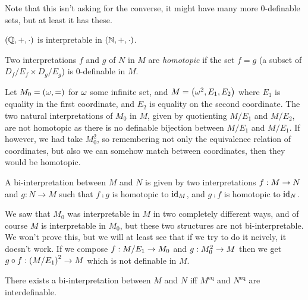 \documentclass{amsart}
\begin{document}
\begin{rmk}
Note that this isn't asking for the converse, it might have many more $0$-definable sets, 
but at least it has these.
\end{rmk}

\begin{exm}
$\left( \mathbb{Q} , + , \cdot \right)$ is interpretable in $\left( \mathbb{N} , + , \cdot \right)$.
\end{exm}

\begin{defn}
Two interpretations $f$ and $g$ of $N$ in $M$
are \emph{homotopic} if the set $f = g$
(a subset of $D_f / E_f \times D_g / E_g$) is $0$-definable in $M$.
\end{defn} 

\begin{exm}
Let $M_0 = \left( \omega , = \right)$ for $\omega$ some infinite set,
and $M = \left( \omega^2 , E_1 , E_2 \right)$ where $E_1$ is equality in the first coordinate, 
and $E_2$ is equality on the second coordinate.
The two natural interpretations of $M_0$ in $M$, given by quotienting
$M / E_1$ and $M / E_2$, are not homotopic as there is no definable bijection between
$M / E_1$ and $M / E_1$.
If however, we had take $M_0^2$, so remembering not only the equivalence relation
of coordinates, but also we can somehow match between coordinates, 
then they would be homotopic.
\end{exm}

\begin{defn}
A bi-interpretation between $M$ and $N$
is given by two interpretations $f:M\rightarrow N$ and $g:N\to M$
such that $f\comp g$ is homotopic to $\operatorname{id}_M$, 
and $g\comp f$ is homotopic to $\operatorname{id}_N$.
\end{defn}

\begin{exm}
We saw that $M_0$ was interpretable in $M$ in two completely different ways, 
and of course $M$ is interpretable in $M_0$, but these two structures 
are not bi-interpretable. 
We won't prove this, but we will at least see that if we try to do it neively, it doesn't work.
If we compose $f:M / E_1 \rightarrow M_0$
and $g: M_0^2 \rightarrow M$ then we get 
$g\circ f : \left( M/ E_1 \right)^2 \rightarrow M$
which is not definable in $M$.
\end{exm}

\begin{rmk}
There exists a bi-interpretation between $M$ and $N$ 
iff $M^{\text{eq}}$ and $N^{\text{eq}}$ are interdefinable.
\end{rmk}
\end{document}
